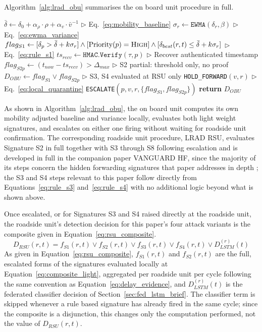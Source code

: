 \documentclass[final,5p,twocolumn]{elsarticle}
\renewcommand{\Comment}[1]{\hfill$\triangleright$ #1}
\theoremstyle{remark}
\theoremstyle{plain}
\begin{document}
Algorithm~\ref{alg:lrad_obu} summarises the on board unit procedure in full.
\begin{algorithm}[!t]
	\caption{Lightweight Rule Based Attack Detection at the On Board Unit (LRAD OBU)}
	\label{alg:lrad_obu}
	\begin{algorithmic}[1]
		\small
		\State $\bar{\delta} \gets \delta_0 + \alpha_\rho \cdot \rho + \alpha_v \cdot \bar{v}^{-1}$ \Comment{Eq.~\eqref{eq:mobility_baseline}}
		\State $\sigma_r \gets \texttt{EWMA}(\delta_r, \beta)$ \Comment{Eq.~\eqref{eq:ewma_variance}}
		\State $flag_{S1} \gets [\delta_p > \bar{\delta} + k\sigma_r] \land [\text{Priority}(p) = \textsc{High}] \land [\delta_{best}(r,t) \leq \bar{\delta} + k\sigma_r]$ \Comment{Eq.~\eqref{eq:rule_s1}}
		\State $ts_{recv} \gets \texttt{HMAC.Verify}(\tau, p)$ \Comment{Recover authenticated timestamp}
		\State $flag_{S2p} \gets (t_{now} - ts_{recv}) > \Delta_{max}$ \Comment{S2 partial: threshold only, no proof}
		\State $D_{OBU} \gets flag_{S1} \lor flag_{S2p}$ \Comment{S3, S4 evaluated at RSU only}
		\State \texttt{HOLD\_FORWARD}$(v,r)$ \Comment{Eq.~\eqref{eq:local_quarantine}}
		\State \texttt{ESCALATE}$(p, v, r, \{flag_{S1}, flag_{S2p}\})$
		\EndIf
		\State \textbf{return} $D_{OBU}$
		\EndProcedure
	\end{algorithmic}
\end{algorithm}
As shown in Algorithm~\ref{alg:lrad_obu}, the on board unit computes its own
mobility adjusted baseline and variance locally, evaluates both light weight
signatures, and escalates on either one firing without waiting for roadside
unit confirmation. The corresponding roadside unit procedure, LRAD RSU,
evaluates Signature S2 in full together with S3 through S8 following
escalation and is developed in full in the companion paper VANGUARD HF,
since the majority of its steps concern the hidden forwarding signatures
that paper addresses in depth \cite{VanguardHF2026}; the S3 and S4 steps
relevant to this paper follow directly from Equations~\eqref{eq:rule_s3}
and~\eqref{eq:rule_s4} with no additional logic beyond what is shown above.

Once escalated, or for Signatures S3 and S4 raised directly at the
roadside unit, the roadside unit's detection decision for this paper's
four attack variants is the composite given in
Equation~\eqref{eq:rsu_composite}.
\begin{equation}
	D_{RSU}(r,t) = f_{S1}(r,t) \lor f_{S2}(r,t) \lor f_{S3}(r,t) \lor f_{S4}(r,t) \lor D_{LSTM}^{(r)}(t)
	\label{eq:rsu_composite}
\end{equation}
As given in Equation~\eqref{eq:rsu_composite}, $f_{S1}(r,t)$ and
$f_{S2}(r,t)$ are the full, escalated forms of the signatures evaluated
locally at Equation~\eqref{eq:composite_light}, aggregated per roadside
unit per cycle following the same convention as
Equation~\eqref{eq:delay_evidence}, and $D_{LSTM}^{(r)}(t)$ is the
federated classifier decision of Section~\ref{sec:fed_lstm_brief}. The
classifier term is skipped whenever a rule based signature has already
fired in the same cycle; since the composite is a disjunction, this
changes only the computation performed, not the value of
$D_{RSU}(r,t)$.
\end{document}
